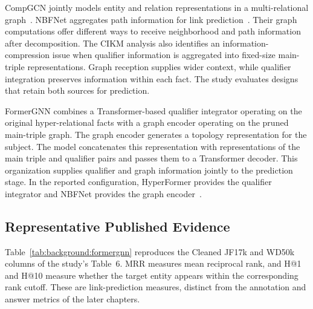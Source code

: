 CompGCN jointly models entity and relation representations in a multi-relational graph~\cite{bg-compgcn}. NBFNet aggregates path information for link prediction~\cite{bg-nbfnet}. Their graph computations offer different ways to receive neighborhood and path information after decomposition. The CIKM analysis also identifies an information-compression issue when qualifier information is aggregated into fixed-size main-triple representations. Graph reception supplies wider context, while qualifier integration preserves information within each fact. The study evaluates designs that retain both sources for prediction.

FormerGNN combines a Transformer-based qualifier integrator operating on the original hyper-relational facts with a graph encoder operating on the pruned main-triple graph. The graph encoder generates a topology representation for the subject. The model concatenates this representation with representations of the main triple and qualifier pairs and passes them to a Transformer decoder. This organization supplies qualifier and graph information jointly to the prediction stage. In the reported configuration, HyperFormer provides the qualifier integrator and NBFNet provides the graph encoder~\cite{bg-hyperformer,bg-nbfnet}.

\subsection{Representative Published Evidence}

Table~\ref{tab:background:formergnn} reproduces the Cleaned JF17k and WD50k columns of the study's Table~6. MRR measures mean reciprocal rank, and H@1 and H@10 measure whether the target entity appears within the corresponding rank cutoff. These are link-prediction measures, distinct from the annotation and answer metrics of the later chapters.

